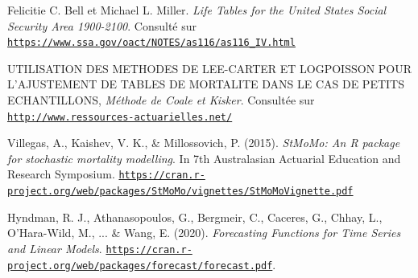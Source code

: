 \documentclass[french]{report}
\begin{document}
\begin{thebibliography}{9}
Felicitie C. Bell et Michael L. Miller. \textit{Life Tables for the United States Social Security Area 1900-2100}. Consulté sur \texttt{\url{https://www.ssa.gov/oact/NOTES/as116/as116_IV.html}}
\vskip 0.1in

\vskip 0.1in
UTILISATION DES METHODES DE LEE-CARTER ET LOGPOISSON POUR L'AJUSTEMENT DE TABLES DE MORTALITE
DANS LE CAS DE PETITS ECHANTILLONS, \textit{Méthode de Coale et Kisker}. Consultée sur \texttt{\url{http://www.ressources-actuarielles.net/}}
\vskip 0.1in


Villegas, A., Kaishev, V. K., \& Millossovich, P. (2015). \textit{StMoMo: An R package for stochastic mortality modelling}. In 7th Australasian Actuarial Education and Research Symposium. \texttt{\url{https://cran.r-project.org/web/packages/StMoMo/vignettes/StMoMoVignette.pdf}}
\vskip 0.1in


Hyndman, R. J., Athanasopoulos, G., Bergmeir, C., Caceres, G., Chhay, L., O'Hara-Wild, M., ... & Wang, E. (2020). \textit{Forecasting Functions for Time Series and Linear Models}. \texttt{\url{https://cran.r-project.org/web/packages/forecast/forecast.pdf}}.
\vskip 0.1in









\end{thebibliography}
\end{document}
